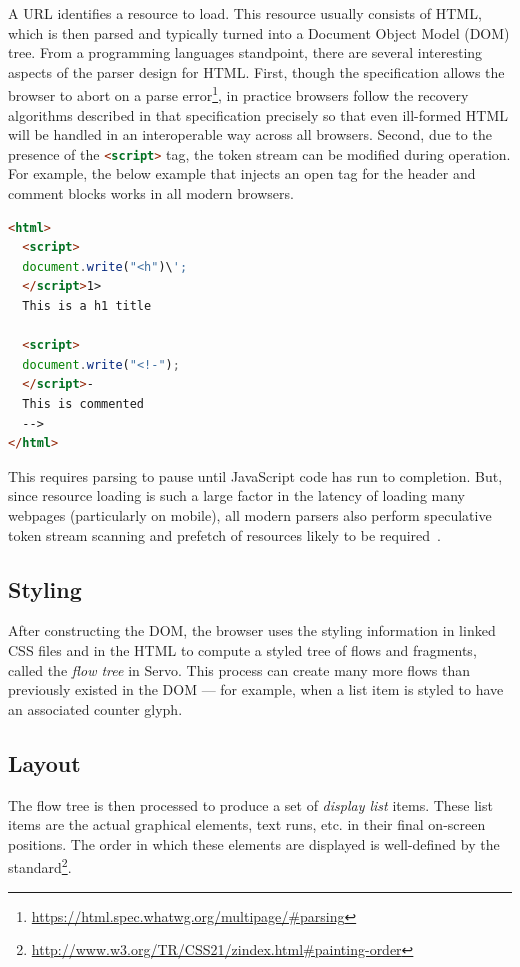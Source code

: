 A URL identifies a resource to load.
This resource usually consists of HTML, which is then parsed and typically turned into a Document Object
Model (DOM) tree.
From a programming languages standpoint, there are several interesting aspects of the parser design
for HTML.
First, though the specification allows the browser to abort on a parse error\footnote{\url{https://html.spec.whatwg.org/multipage/#parsing}},
in practice browsers follow the recovery algorithms described in that specification precisely so that
even ill-formed HTML will be handled in an interoperable way across all browsers.
Second, due to the presence of the \lstinline[language=HTML]{<script>} tag, the token stream can be modified
during operation.
For example, the below example that injects an open tag for the header and comment blocks works in all modern browsers.
\begin{lstlisting}[language=HTML]
<html>
  <script>
  document.write("<h")\';
  </script>1>
  This is a h1 title

  <script>
  document.write("<!-");
  </script>-
  This is commented
  -->
</html>
\end{lstlisting}
This requires parsing to pause until JavaScript code has run to completion.
But, since resource loading is such a large factor in the latency of loading many webpages (particularly on mobile),
all modern parsers also perform speculative token stream scanning and prefetch of resources likely to be required~\cite{browsers-slow-smartphones}.

\subsection{Styling}

After constructing the DOM, the browser uses the styling information in linked
CSS files and in the HTML to compute a styled tree of flows and fragments,
called the \emph{flow tree} in Servo.
This process can create many more flows than previously existed in the DOM ---
for example, when a list item is styled to have an associated counter glyph.

\subsection{Layout}

The flow tree is then processed to produce a set of \emph{display list} items.
These list items are the actual graphical elements, text runs, etc. in their
final on-screen positions.
The order in which these elements are displayed is well-defined by the
standard\footnote{\url{http://www.w3.org/TR/CSS21/zindex.html#painting-order}}.

